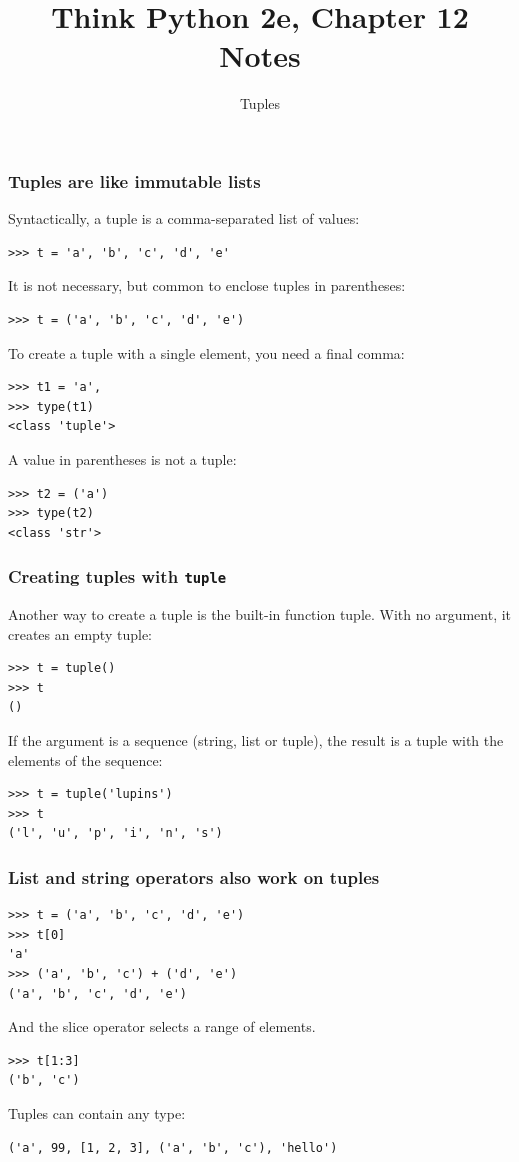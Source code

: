 \documentclass{beamer}
\title{Think Python 2e, Chapter 12 Notes}
\author{Tuples}
\newcommand{\bfr}[1]{\begin{frame}[fragile]\frametitle{{ #1 }}}
\begin{document}
\begin{frame}
\maketitle
\end{frame}

\bfr{Tuples are like immutable lists}
Syntactically, a tuple is a comma-separated list of values:
\begin{lstlisting}
>>> t = 'a', 'b', 'c', 'd', 'e'
\end{lstlisting}
It is not necessary, but common to enclose tuples in parentheses:
\begin{lstlisting}
>>> t = ('a', 'b', 'c', 'd', 'e')
\end{lstlisting}
To create a tuple with a single element, you need a final comma:
\begin{lstlisting}
>>> t1 = 'a',
>>> type(t1)
<class 'tuple'>
\end{lstlisting}
A value in parentheses is not a tuple:
\begin{lstlisting}
>>> t2 = ('a')
>>> type(t2)
<class 'str'>
\end{lstlisting}

\end{frame}

\bfr{Creating tuples with {\tt tuple}}
Another way to create a tuple is the built-in function tuple. With no argument, it creates an empty tuple:
\begin{lstlisting}
>>> t = tuple()
>>> t
()
\end{lstlisting}
If the argument is a sequence (string, list or tuple), the result is a tuple with the elements of the sequence:
\begin{lstlisting}
>>> t = tuple('lupins')
>>> t
('l', 'u', 'p', 'i', 'n', 's')
\end{lstlisting}
\end{frame}

\bfr{List and string operators also work on tuples}
\begin{lstlisting}
>>> t = ('a', 'b', 'c', 'd', 'e')
>>> t[0]
'a'
>>> ('a', 'b', 'c') + ('d', 'e')
('a', 'b', 'c', 'd', 'e')
\end{lstlisting}
And the slice operator selects a range of elements.
\begin{lstlisting}
>>> t[1:3]
('b', 'c')
\end{lstlisting}
Tuples can contain any type:
\begin{lstlisting}
('a', 99, [1, 2, 3], ('a', 'b', 'c'), 'hello')
\end{lstlisting}
\end{frame}
\end{document}
